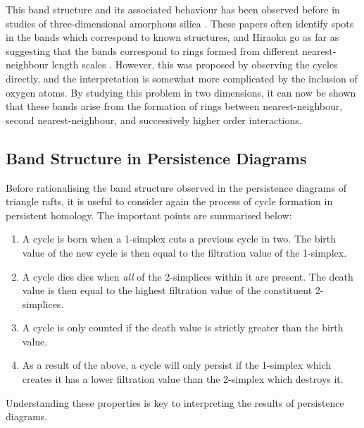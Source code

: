This band structure and its associated behaviour has been observed before in studies of three\--dimensional amorphous silica \cite{Nakamura2015,Hiraoka2016,Robins2017}.
These papers often identify spots in the bands which correspond to known structures, and Hiraoka \etal{} go as far as suggesting that the bands correspond to rings formed from different nearest\--neighbour length scales \cite{Hiraoka2016}.
However, this was proposed by observing the cycles directly, and the interpretation is somewhat more complicated by the inclusion of oxygen atoms.
By studying this problem in two dimensions, it can now be shown that these bands arise from the formation of rings between nearest\--neighbour, second nearest\--neighbour, and successively higher order interactions.


\subsection{Band Structure in Persistence Diagrams}

Before rationalising the band structure observed in the persistence diagrams of triangle rafts, it is useful to consider again the process of cycle formation in persistent homology.
The important points are summarised below:
\begin{enumerate}
	\item A cycle is born when a 1\--simplex cuts a previous cycle in two. The birth value of the new cycle is then equal to the filtration value of the 1\--simplex.
	\item A cycle dies dies when \textit{all} of the 2\--simplices within it are present. The death value is then equal to the highest filtration value of the  constituent 2\--simplices.
	\item A cycle is only counted if the death value is strictly greater than the birth value.
	\item As a result of the above, a cycle will only persist if the 1\--simplex which creates it has a lower filtration value than the 2\--simplex which destroys it.
\end{enumerate}
Understanding these properties is key to interpreting the results of persistence diagrams.


